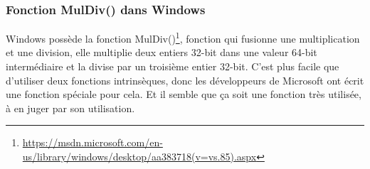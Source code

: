 \subsubsection{Fonction MulDiv() dans Windows}

Windows possède la fonction MulDiv()\footnote{\url{https://msdn.microsoft.com/en-us/library/windows/desktop/aa383718(v=vs.85).aspx}},
fonction qui fusionne une multiplication et une division, elle multiplie deux entiers
32-bit dans une valeur 64-bit intermédiaire et la divise par un troisième entier 32-bit.
C'est plus facile que d'utiliser deux fonctions intrinsèques, donc les développeurs
de Microsoft ont écrit une fonction spéciale pour cela.
Et il semble que ça soit une fonction très utilisée, à en juger par son utilisation.

